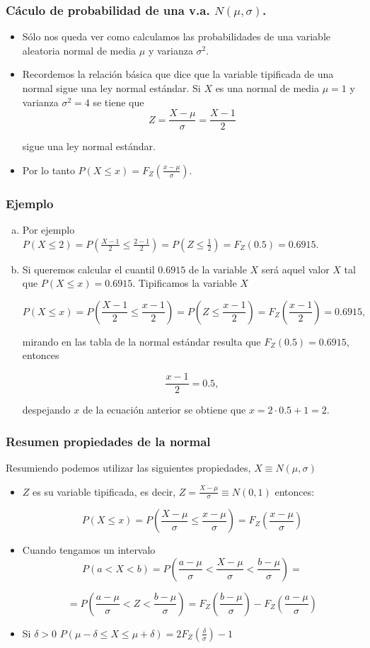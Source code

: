 \begin{frame}
\frametitle{Cáculo de probabilidad de una v.a. $N(\mu,\sigma)$.}
\begin{itemize}
\item Sólo nos queda ver como calculamos las probabilidades de una variable aleatoria normal de media $\mu$ y varianza $\sigma^2$.
\item  Recordemos la relación básica que dice que la variable tipificada de una normal sigue una ley normal estándar. Si $X$ es una normal de media
$\mu=1$ y varianza $\sigma^2=4$ se tiene que 
$$Z=\frac{X-\mu}{\sigma}=\frac{X-1}{2}$$

sigue una ley  normal estándar.
\item Por lo tanto   $P(X\leq x)=F_Z(\frac{x-\mu}{\sigma})$.
\end{itemize}
\end{frame}

\begin{frame}
\frametitle{Ejemplo}
\begin{enumerate}[a)]
\item 
Por ejemplo $P(X\leq 2)=P(\frac{X-1}{2}\leq \frac{2-1}{2})=P(Z\leq \frac{1} {2})=F_Z(0.5)=0.6915$.
\item Si queremos calcular el cuantil $0.6915$ de la variable $X$ será aquel valor $X$ tal que $P(X\leq x)=0.6915$. Tipificamos la variable $X$

$$P(X\leq x)=P(\frac{X-1}{2}\leq \frac{x-1}{2})=P(Z\leq \frac{x-1} {2})=F_Z(\frac{x-1} {2})=0.6915 ,$$

mirando en las tabla de la normal estándar resulta que $F_Z(0.5)=0.6915$, entonces 

$$ \frac{x-1} {2}=0.5 ,$$

despejando $x$ de la ecuación anterior se obtiene que $x=2\cdot 0.5+1= 2$.
\end{enumerate}
\end{frame}
 
 
 
 \begin{frame}
\frametitle{Resumen propiedades de la normal}
Resumiendo podemos utilizar las siguientes propiedades, $X\equiv N(\mu,\sigma)$
    \begin{itemize}
    \item  $Z$ es su variable tipificada, es decir,
    $Z=\frac{X-\mu}{\sigma}\equiv N(0,1)$ entonces:

    $$P(X\leq x)=P(\frac{X-\mu}{\sigma}\leq
    \frac{x-\mu}{\sigma})=F_{Z}(\frac{x-\mu}{\sigma})$$

   \item  Cuando tengamos un intervalo
    $$P(a<X<b)=P(\frac{a-\mu}{\sigma}<\frac{X-\mu}{\sigma}<\frac{b-\mu}{\sigma})=$$

    $$=P(\frac{a-\mu}{\sigma}<Z<\frac{b-\mu}{\sigma})=F_{Z}(\frac{b-\mu}{\sigma})-
    F_{Z}(\frac{a-\mu}{\sigma})$$
    \item Si $\delta>0$ $P(\mu-\delta\leq X \leq
\mu+\delta)=2 F_Z(\frac{\delta}{\sigma})-1$
\end{itemize}
\end{frame}

